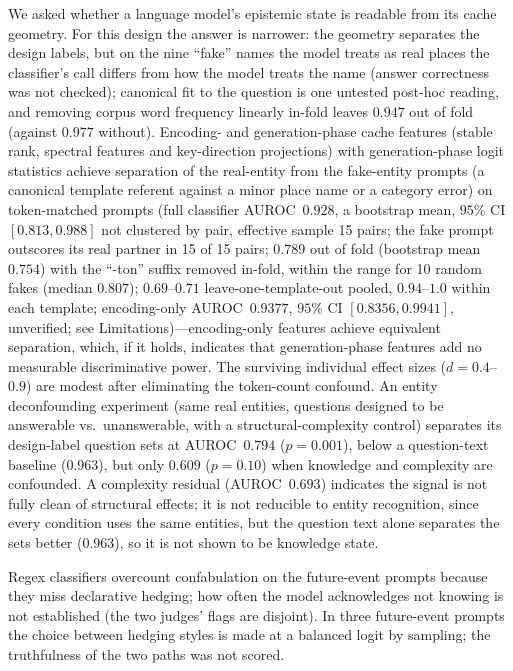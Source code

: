 \documentclass[11pt,a4paper]{article}
\begin{document}
We asked whether a language model's epistemic state is readable from its
cache geometry. For this design the answer is narrower: the geometry separates the design labels, but on the nine ``fake'' names the model treats as real places the classifier's call differs from how the model treats the name (answer correctness was not checked); canonical fit to the question is one untested post-hoc reading, and removing corpus word frequency linearly in-fold leaves $0.947$ out of fold (against $0.977$ without). Encoding- and generation-phase cache features (stable rank, spectral
features and key-direction projections) with generation-phase logit
statistics achieve separation of the real-entity from the fake-entity prompts (a canonical template
referent against a minor place name or a category error) on
token-matched prompts (full classifier AUROC~$0.928$, a bootstrap mean, $95\%$ CI $[0.813, 0.988]$ not clustered by pair, effective sample 15 pairs; the fake prompt outscores its real partner in 15 of 15 pairs; $0.789$ out of fold (bootstrap mean $0.754$) with the ``-ton'' suffix removed in-fold, within the range for 10 random fakes (median $0.807$); $0.69$--$0.71$ leave-one-template-out pooled, $0.94$--$1.0$ within each template;
encoding-only AUROC~$0.9377$, $95\%$ CI $[0.8356, 0.9941]$, unverified; see Limitations)---encoding-only features achieve equivalent separation, which, if it holds, indicates that generation-phase features add no measurable discriminative power. The
surviving individual effect sizes ($d{=}0.4$--$0.9$) are modest after
eliminating the token-count confound. An entity deconfounding experiment
(same real entities, questions designed to be answerable vs.\ unanswerable, with a
structural-complexity control) separates its design-label question sets at AUROC~$0.794$ ($p{=}0.001$), below a question-text baseline ($0.963$), but only $0.609$ ($p{=}0.10$) when knowledge and complexity are confounded. A complexity residual (AUROC~$0.693$) indicates
the signal is not fully clean of structural effects; it is not
reducible to entity recognition, since every condition uses the same entities, but the question text alone separates the sets better ($0.963$), so it is not shown to be knowledge state.

Regex classifiers overcount confabulation on the future-event prompts because they miss declarative hedging; how often the model acknowledges not knowing is not established (the two judges' flags are disjoint).
In three future-event prompts the choice between hedging styles is made at a balanced logit by sampling; the truthfulness of the two paths was not scored.
\end{document}
